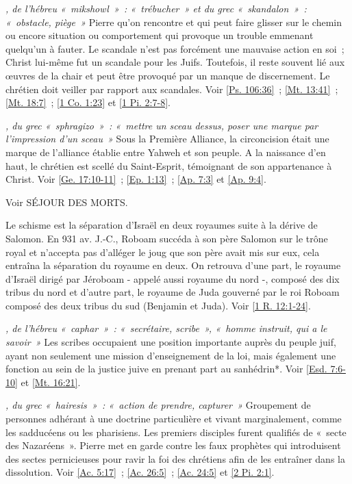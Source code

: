 \begin{multicols}{2}
\textit{, de l'hébreu «~mikshowl~»~: «~trébucher~» et du grec «~skandalon~»~: «~obstacle, piège~»}\newline
Pierre qu'on rencontre et qui peut faire glisser sur le chemin ou encore situation ou comportement qui provoque un trouble emmenant quelqu'un à fauter. Le scandale n'est pas forcément une mauvaise action en soi~; Christ lui-même fut un scandale pour les Juifs. Toutefois, il reste souvent lié aux œuvres de la chair et peut être provoqué par un manque de discernement. Le chrétien doit veiller par rapport aux scandales.\newline
Voir \vref{Ps. 106:36}~; \vref{Mt. 13:41}~; \vref{Mt. 18:7}~; \vref{1 Co. 1:23} et \vref{1 Pi. 2:7-8}.

\textit{, du grec «~sphragizo~»~: «~mettre un sceau dessus, poser une marque par l'impression d'un sceau~»}\newline
Sous la Première Alliance, la circoncision était une marque de l'alliance établie entre Yahweh et son peuple. A la naissance d'en haut, le chrétien est scellé du Saint-Esprit, témoignant de son appartenance à Christ. Voir \vref{Ge. 17:10-11}~; \vref{Ep. 1:13}~; \vref{Ap. 7:3} et \vref{Ap. 9:4}.

\textit{}\newline
Voir SÉJOUR DES MORTS.

\textit{}\newline
Le schisme est la séparation d'Israël en deux royaumes suite à la dérive de Salomon. En 931 av. J.-C., Roboam succéda à son père Salomon sur le trône royal et n'accepta pas d'alléger le joug que son père avait mis sur eux, cela entraîna la séparation du royaume en deux. On retrouva d'une part, le royaume d'Israël dirigé par Jéroboam - appelé aussi royaume du nord -, composé des dix tribus du nord et d'autre part, le royaume de Juda gouverné par le roi Roboam composé des deux tribus du sud (Benjamin et Juda). Voir \vref{1 R. 12:1-24}.

\textit{, de l'hébreu «~caphar~»~: «~secrétaire, scribe~», «~homme instruit, qui a le savoir~»}\newline
Les scribes occupaient une position importante auprès du peuple juif, ayant non seulement une mission d'enseignement de la loi, mais également une fonction au sein de la justice juive en prenant part au sanhédrin*. Voir \vref{Esd. 7:6-10} et \vref{Mt. 16:21}.

\textit{, du grec «~hairesis~»~: «~action de prendre, capturer~»}\newline
Groupement de personnes adhérant à une doctrine particulière et vivant marginalement, comme les sadducéens ou les pharisiens. Les premiers disciples furent qualifiés de «~secte des Nazaréens~». Pierre met en garde contre les faux prophètes qui introduisent des sectes pernicieuses pour ravir la foi des chrétiens afin de les entraîner dans la dissolution. Voir \vref{Ac. 5:17}~; \vref{Ac. 26:5}~; \vref{Ac. 24:5} et \vref{2 Pi. 2:1}.


\end{multicols}
